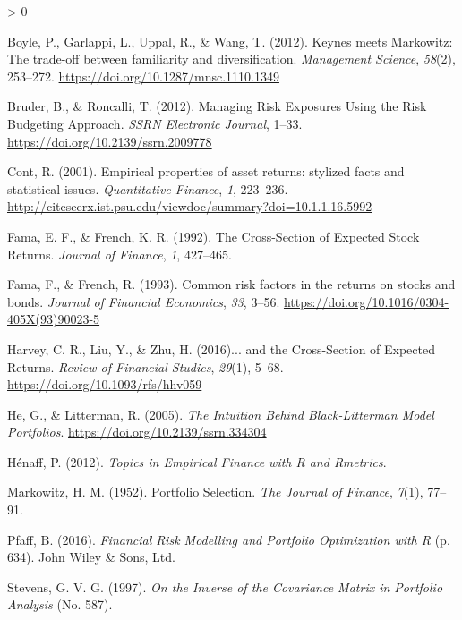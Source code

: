 \documentclass[
  11pt,
]{article}
\newlength{\cslhangindent}
\newenvironment{CSLReferences}[2] %
 {%
  \setlength{\parindent}{0pt}
  \ifodd #1 \everypar{\setlength{\hangindent}{\cslhangindent}}\ignorespaces\fi
  \ifnum #2 > 0
  \setlength{\parskip}{#2\baselineskip}
  \fi
 }%
 {}
\begin{document}
\hypertarget{refs}{}
\begin{CSLReferences}{1}{0}
\leavevmode\hypertarget{ref-Boyle2012}{}%
Boyle, P., Garlappi, L., Uppal, R., \& Wang, T. (2012). {Keynes meets
Markowitz: The trade-off between familiarity and diversification}.
\emph{Management Science}, \emph{58}(2), 253--272.
\url{https://doi.org/10.1287/mnsc.1110.1349}

\leavevmode\hypertarget{ref-Bruder2012}{}%
Bruder, B., \& Roncalli, T. (2012). {Managing Risk Exposures Using the
Risk Budgeting Approach}. \emph{SSRN Electronic Journal}, 1--33.
\url{https://doi.org/10.2139/ssrn.2009778}

\leavevmode\hypertarget{ref-Cont2001}{}%
Cont, R. (2001). {Empirical properties of asset returns: stylized facts
and statistical issues}. \emph{Quantitative Finance}, \emph{1},
223--236.
\url{http://citeseerx.ist.psu.edu/viewdoc/summary?doi=10.1.1.16.5992}

\leavevmode\hypertarget{ref-Fama1992}{}%
Fama, E. F., \& French, K. R. (1992). {The Cross-Section of Expected
Stock Returns}. \emph{Journal of Finance}, \emph{1}, 427--465.

\leavevmode\hypertarget{ref-Fama1993}{}%
Fama, F., \& French, R. (1993). {Common risk factors in the returns on
stocks and bonds}. \emph{Journal of Financial Economics}, \emph{33},
3--56. \url{https://doi.org/10.1016/0304-405X(93)90023-5}

\leavevmode\hypertarget{ref-Harvey2016a}{}%
Harvey, C. R., Liu, Y., \& Zhu, H. (2016){... and the Cross-Section of
Expected Returns}. \emph{Review of Financial Studies}, \emph{29}(1),
5--68. \url{https://doi.org/10.1093/rfs/hhv059}

\leavevmode\hypertarget{ref-He2005}{}%
He, G., \& Litterman, R. (2005). \emph{{The Intuition Behind
Black-Litterman Model Portfolios}}.
\url{https://doi.org/10.2139/ssrn.334304}

\leavevmode\hypertarget{ref-Henaff2012}{}%
Hénaff, P. (2012). \emph{{Topics in Empirical Finance with R and
Rmetrics}}.

\leavevmode\hypertarget{ref-Markowitz1952}{}%
Markowitz, H. M. (1952). {Portfolio Selection}. \emph{The Journal of
Finance}, \emph{7}(1), 77--91.

\leavevmode\hypertarget{ref-Pfaff2016}{}%
Pfaff, B. (2016). \emph{{Financial Risk Modelling and Portfolio
Optimization with R}} (p. 634). John Wiley \& Sons, Ltd.

\leavevmode\hypertarget{ref-Ste1997}{}%
Stevens, G. V. G. (1997). \emph{{On the Inverse of the Covariance Matrix
in Portfolio Analysis}} (No. 587).


\end{CSLReferences}
\end{document}
